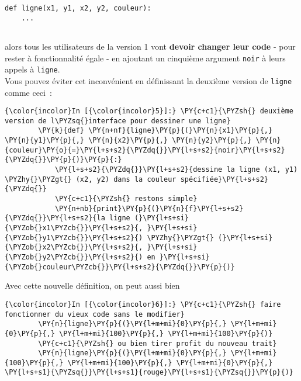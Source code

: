 \begin{verbatim}
def ligne(x1, y1, x2, y2, couleur):
    ...
  
\end{verbatim}

alors tous les utilisateurs de la version 1 vont \textbf{devoir changer
leur code} - pour rester à fonctionnalité égale - en ajoutant un
cinquième argument \texttt{\textquotesingle{}noir\textquotesingle{}} à
leurs appels à \texttt{ligne}.\\

    Vous pouvez éviter cet inconvénient en définissant la deuxième version
de \texttt{ligne} comme ceci~:

    \begin{Verbatim}[commandchars=\\\{\}]
{\color{incolor}In [{\color{incolor}5}]:} \PY{c+c1}{\PYZsh{} deuxième version de l\PYZsq{}interface pour dessiner une ligne}
        \PY{k}{def} \PY{n+nf}{ligne}\PY{p}{(}\PY{n}{x1}\PY{p}{,} \PY{n}{y1}\PY{p}{,} \PY{n}{x2}\PY{p}{,} \PY{n}{y2}\PY{p}{,} \PY{n}{couleur}\PY{o}{=}\PY{l+s+s2}{\PYZdq{}}\PY{l+s+s2}{noir}\PY{l+s+s2}{\PYZdq{}}\PY{p}{)}\PY{p}{:}
            \PY{l+s+s2}{\PYZdq{}}\PY{l+s+s2}{dessine la ligne (x1, y1) \PYZhy{}\PYZgt{} (x2, y2) dans la couleur spécifiée}\PY{l+s+s2}{\PYZdq{}}
            \PY{c+c1}{\PYZsh{} restons simple}
            \PY{n+nb}{print}\PY{p}{(}\PY{n}{f}\PY{l+s+s2}{\PYZdq{}}\PY{l+s+s2}{la ligne (}\PY{l+s+si}{\PYZob{}x1\PYZcb{}}\PY{l+s+s2}{, }\PY{l+s+si}{\PYZob{}y1\PYZcb{}}\PY{l+s+s2}{) \PYZhy{}\PYZgt{} (}\PY{l+s+si}{\PYZob{}x2\PYZcb{}}\PY{l+s+s2}{, }\PY{l+s+si}{\PYZob{}y2\PYZcb{}}\PY{l+s+s2}{) en }\PY{l+s+si}{\PYZob{}couleur\PYZcb{}}\PY{l+s+s2}{\PYZdq{}}\PY{p}{)}
\end{Verbatim}


    Avec cette nouvelle définition, on peut aussi bien

    \begin{Verbatim}[commandchars=\\\{\}]
{\color{incolor}In [{\color{incolor}6}]:} \PY{c+c1}{\PYZsh{} faire fonctionner du vieux code sans le modifier}
        \PY{n}{ligne}\PY{p}{(}\PY{l+m+mi}{0}\PY{p}{,} \PY{l+m+mi}{0}\PY{p}{,} \PY{l+m+mi}{100}\PY{p}{,} \PY{l+m+mi}{100}\PY{p}{)}
        \PY{c+c1}{\PYZsh{} ou bien tirer profit du nouveau trait}
        \PY{n}{ligne}\PY{p}{(}\PY{l+m+mi}{0}\PY{p}{,} \PY{l+m+mi}{100}\PY{p}{,} \PY{l+m+mi}{100}\PY{p}{,} \PY{l+m+mi}{0}\PY{p}{,} \PY{l+s+s1}{\PYZsq{}}\PY{l+s+s1}{rouge}\PY{l+s+s1}{\PYZsq{}}\PY{p}{)}
\end{Verbatim}


